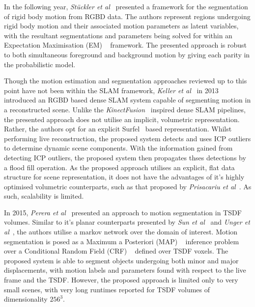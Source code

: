 In the following year, \textit{St{\"u}ckler et al}~\cite{Stueckler2013} presented a framework 
for the segmentation of rigid body motion from RGBD data. The authors represent regions undergoing 
rigid body motion and their associated motion parameters as latent variables, with the resultant 
segmentations and parameters being solved for within an Expectation Maximisation (EM) 
~\cite{BishopPRML, Murphy2012ML} framework. The presented approach is robust to both simultaneous 
foreground and background motion by giving each parity in the probabilistic model.

Though the motion estimation and segmentation approaches reviewed up to this point have not 
been within the SLAM framework, \textit{Keller et al}~\cite{Keller2013} in 2013 introduced an 
RGBD based dense SLAM system capable of segmenting motion in a reconstructed scene. Unlike the 
\textit{KinectFusion}~\cite{Newcombe2011} inspired dense SLAM pipelines, the presented approach 
does not utilise an implicit, volumetric representation. Rather, the authors opt for an explicit 
Surfel~\cite{Pfister2000} based representation. Whilst performing live reconstruction, the proposed 
system detects and uses ICP outliers to determine dynamic scene components. With the information gained 
from detecting ICP outliers, the proposed system then propagates thses detections by a flood fill operation. 
As the proposed approach utilises an explicit, flat data structure for scene representation, it does not 
have the advantages of it's highly optimised volumetric counterparts, such as that proposed by 
\textit{Prisacariu et al}~\cite{Prisacariu2011}. As such, scalability is limited.

In 2015, \textit{Perera et al}~\cite{Perera2015} presented an approach to motion segmentation in 
TSDF volumes. Similar to it's planar counterparts presented by \textit{Sun et al}~\cite{Sun2012} 
and \textit{Unger et al}~\cite{Unger2012}, the authors utilise a markov network over the domain 
of interest. Motion segmentation is posed as a Maximum a Posteriori (MAP) 
~\cite{BishopPRML, Murphy2012ML} inference problem over a Conditional Random Field (CRF) 
~\cite{Krahenbuhl2011} defined over TSDF voxels. The proposed system is able to segment objects 
undergoing both minor and major displacements, with motion labels and parameters found with 
respect to the live frame and the TSDF. However, the proposed approach is limited only to very 
small scenes, with very long runtimes reported for TSDF volumes of dimensionality \(256^{3}\).

